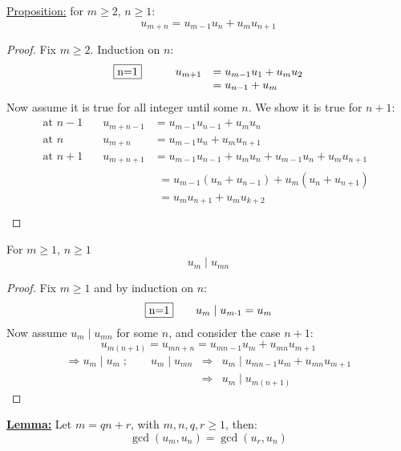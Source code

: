 \documentclass{report}
\begin{document}
\underline{Proposition:} for $m\geq 2$, $n \geq 1$: \[u_{m+n}=u_{m-1}u_n+u_mu_{n+1}\]
\begin{proof} Fix $m\geq 2$. Induction on $n$:
														\[\begin{array}{lcl}
														\fbox{n=1}\qquad &u_{m+1}&=u_{m-1}u_1+u_mu_2\\
																										&&=u_{n-1}+u_m
															\end{array}\]
							Now assume it is true for all integer until some $n$. We show it is true for $n+1$:
														\[\begin{array}{lcl}
														\text{at } n-1\quad &u_{m+n-1}&=u_{m-1}u_{n-1}+u_mu_n\\
														\text{at } n  \quad &u_{m+n}  &=u_{m-1}u_n+u_mu_{n+1}\\
														\text{at } n+1\quad &u_{m+n+1}&=u_{m-1}u_{n-1}+u_mu_n+u_{m-1}u_n+u_mu_{n+1}\\
																												&& \begin{array}{lcl}
																														=u_{m-1}(u_n+u_{n-1})+u_m(u_n+u_{n+1})\\
																														=u_mu_{n+1}+u_mu_{k+2}\\
																														\end{array}
														\end{array}\]
\end{proof}																									
\begin{thm} For $m\geq 1$, $n \geq 1$ \[u_m\mid u_{mn}\]
\end{thm}
\begin{proof} Fix $m\geq 1$ and by induction on $n$:\\
									\[\fbox{n=1} \qquad u_m\mid u_{m\cdot 1}=u_m\]
							Now assume $u_m\mid u_{mn}$ for some $n$, and consider the case $n+1$:
									\[u_{m(n+1)}=u_{mn+n}=u_{mn-1}u_m+u_{mn}u_{m+1}\]
									\[\begin{array}{lcl} \Rightarrow u_m\mid u_m \; ;\qquad u_m \mid u_{mn} &\Rightarrow& u_m \mid u_{mn-1}u_m+u_{mn}u_{m+1}\\
																																												&\Rightarrow& u_m \mid u_{m(n+1)}
										\end{array}\]
\end{proof}
\underline{\textbf{Lemma:}} Let $m=qn+r$, with $m,n,q,r \geq 1$, then:
														\[\gcd(u_m,u_n)=\gcd(u_r,u_n)\]
\end{document}
